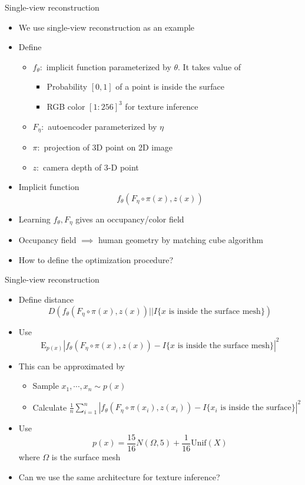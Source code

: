 \documentclass{beamer}
\begin{document}
	\begin{frame}{Single-view reconstruction}
		\begin{itemize}
			\item We use single-view reconstruction as an example
			\item Define
			\begin{itemize}
				\item $f_\theta:$ implicit function parameterized by $\theta$. It takes value of
				\begin{itemize}
					\item Probability $[0,1]$ of a point is inside the surface 
					\item RGB color $[1:256]^3$ for texture inference
				\end{itemize}
				\item $F_\eta:$ autoencoder parameterized by $\eta$
				\item $\pi:$ projection of 3D point on 2D image
				\item $z:$ camera depth of 3-D point
			\end{itemize}
			\item Implicit function $$f_\theta\left(F_\eta\circ\pi\left(x\right),z\left(x\right)\right)$$
			\item Learning $f_\theta,F_\eta$ gives an occupancy/color field
			\item Occupancy field $\implies$ human geometry by matching cube algorithm
			\item How to define the optimization procedure?
		\end{itemize}
	\end{frame}

	\begin{frame}{Single-view reconstruction}
		\begin{itemize}
			\item Define distance $$D\left(f_\theta\left(F_\eta\circ\pi\left(x\right),z\left(x\right)\right)||I\{x\text{ is inside the surface mesh}\}\right)$$
			\item Use $$\text{E}_{p(x)}\left|f_\theta\left(F_\eta\circ\pi\left(x\right),z(x)\right)-I\{x\text{ is inside the surface mesh}\}\right|^2$$
			\item This can be approximated by
			\begin{itemize}
				\item Sample $x_1,\cdots,x_n\sim p(x)$
				\item Calculate $\frac{1}{n}\sum_{i=1}^n\left|f_\theta\left(F_\eta\circ\pi\left(x_i\right),z\left(x_i\right)\right)-I\{x_i\text{ is inside the surface}\}\right|^2$
			\end{itemize}
			\item Use $$p(x)=\frac{15}{16}N\left(\Omega,5\right)+\frac{1}{16}\text{Unif}\left(X\right)$$ where $\Omega$ is the surface mesh
			\item Can we use the same architecture for texture inference?
		\end{itemize}
	\end{frame}
	
\end{document}
